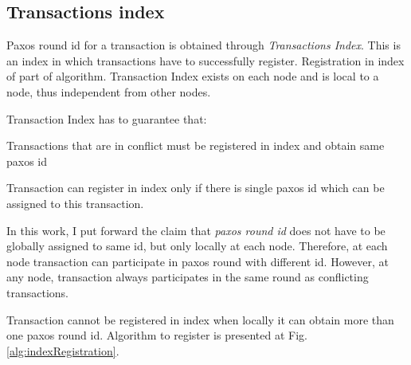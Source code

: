 \subsection{Transactions index}
Paxos round id for a transaction is obtained through \emph{Transactions Index}. This is an index in which transactions have to successfully register. Registration in index of part of \mpp algorithm. Transaction Index exists on each node and is local to a node, thus independent from other nodes.

Transaction Index has to guarantee that: 
\begin{enumerate*}
\item Transactions that are in conflict must be registered in index and obtain same paxos id
\item Transaction can register in index only if there is single paxos id which can be assigned to this transaction.
\end{enumerate*}

In this work, I put forward the claim that \emph{paxos round id} does not have to be globally assigned to same id, but only locally at each node. Therefore, at each node transaction can participate in paxos round with different id. However, at any node, transaction always participates in the same round as conflicting transactions.

Transaction cannot be registered in index when locally it can obtain more than one paxos round id. Algorithm to register is presented at Fig. \ref{alg:indexRegistration}.


